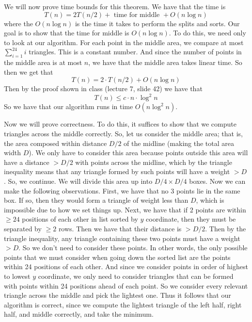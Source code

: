 \documentclass{article}
\begin{document}
\vspace{8mm}
We will now prove time bounds for this theorem. We have that the time is
\[ T(n) = 2T(n/2) + \text{ time for middle } + O(n \log n) \]
where the $O(n \log n)$ is the time it takes to perform the splits and sorts.
Our goal is to show that the time for middle is $O(n \log n)$. To do this,
we need only to look at our algorithm. For each point in the middle area, we
compare at most $\sum_{i=1}^{24} i$ triangles. This is a constant number. And
since the number of points in the middle area is at most $n$, we have that the
middle area takes linear time. So then we get that
\[ T(n) = 2 \cdot T(n/2) + O(n \log n) \]
Then by the proof shown in class (lecture 7, slide 42) we have that
\[ T(n) \leq c \cdot n \cdot \log^2 n \]
So we have that our algorithm runs in time $O(n \log^2 n)$.

\vspace{8mm}
Now we will prove correctness. To do this, it suffices to show that we compute
triangles across the middle correctly. So, let us consider the middle area; that is, the
area composed within distance $D/2$ of the midline (making the total area width
$D$). We only have to consider this area because points outside this area will
have a distance $>D/2$ with points across the midline, which by the triangle
inequality means that any triangle formed by such points will have a weight
$>D$. So, we continue.
We will divide this area up into $D/4 \times D/4$ boxes. Now we can make
the following observations. First, we have that no $3$ points lie in the same
box. If so, then they would form a triangle of weight less than $D$, which is
impossible due to how we set things up. Next, we have that if $2$ points are
within $\ge 24$ positions of each other in list sorted by $y$ coordinate, then
they must be separated by $\ge 2$ rows. Then we have that their distance is $>
D/2$. Then by the triangle inequality, any triangle containing these two points
must have a weight $>D$. So we don't need to consider these points. In other
words, the only possible points that we must consider when going down the sorted
list are the points within 24 positions of each other. And since we consider
points in order of highest to lowest $y$ coordinate, we only need to consider
triangles that can be formed with points within 24 positions ahead of each
point. So we consider every relevant triangle across the middle and pick the
lightest one. Thus it follows that our
algorithm is correct, since we compute the lightest triangle of the left half,
right half, and middle correctly, and take the minimum.
\newpage
\end{document}
